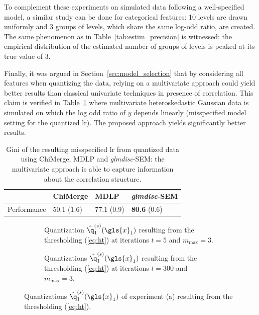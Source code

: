 To complement these experiments on simulated data following a well-specified model, a similar study can be done for categorical features: 10 levels are drawn uniformly and 3 groups of levels, which share the same log-odd ratio, are created. The same phenomenon as in Table~\ref{tab:estim_precision} is witnessed: the empirical distribution of the estimated number of groups of levels is peaked at its true value of 3.

Finally, it was argued in Section~\ref{sec:model_selection} that by considering all features when quantizing the data, relying on a multivariate approach could yield better results than classical univariate techniques in presence of correlation. This claim is verified in Table~\ref{tab:sim_false} where multivariate heteroskedastic Gaussian data is simulated on which the log odd ratio of $y$ depends linearly (misspecified model setting for the quantized \gls{lr}). The proposed approach yields significantly better results.

\begin{table}[ht]
    \centering
    \caption{Gini of the resulting misspecified \gls{lr} from quantized data using ChiMerge, MDLP and \textit{glmdisc}-SEM: the multivariate approach is able to capture information about the correlation structure.}
    \label{tab:sim_false}
\begin{tabular}{llll}
 & ChiMerge & MDLP & \textit{glmdisc}-SEM \\
\hline
Performance & 50.1 (1.6) & 77.1 (0.9) & \textbf{80.6} (0.6)
\end{tabular}
\end{table}



 \newlength\figureheight
 \newlength\figurewidth
 \setlength\figureheight{4cm}
 \setlength\figurewidth{14cm}
 
  \begin{figure}[!ht]
    \centering
    \begin{subfigure}[t]{\textwidth}
        \centering
        
        \vspace{-0.5cm}
        \caption{\label{fig:MAP1} Quantization $\hat{\q}^{(s)}_1(\gls{x}_1)$ resulting from the thresholding (\ref{eq:ht}) at iterations $t = 5$ and $m_{\text{max}} = 3$.}
    \end{subfigure}%
    
    \begin{subfigure}[t]{\textwidth}
        \centering
        
        \vspace{-0.5cm}
        \caption{Quantizations $\hat{\q}^{(s)}_1(\gls{x}_1)$ resulting from the thresholding (\ref{eq:ht}) at iterations $t = 300$ and $m_{\text{max}} = 3$.}
    \end{subfigure}
    
    \caption{\label{fig:MAP} Quantizations $\hat{\q}^{(s)}_1(\gls{x}_1)$ of experiment (a) resulting from the thresholding (\ref{eq:ht}).}
\end{figure}

